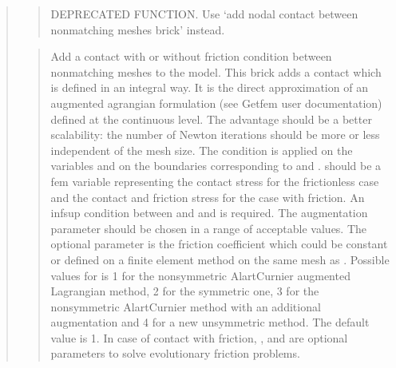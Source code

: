 \documentclass[a4paper,11pt,english]{sphinxmanual}
\begin{document}
\begin{quote}
\begin{quote}

DEPRECATED FUNCTION. Use ‘add nodal contact between nonmatching meshes brick’ instead.
\end{quote}

\begin{quote}

Add a contact with or without friction condition between nonmatching
meshes to the model. This brick adds a contact which is defined
in an integral way. It is the direct approximation of an augmented
agrangian formulation (see Getfem user documentation) defined at the
continuous level. The advantage should be a better scalability:
the number of Newton iterations should be more or less independent
of the mesh size.
The condition is applied on the variables  and 
on the boundaries corresponding to  and .
 should be a fem variable representing the contact stress
for the frictionless case and the contact and friction stress for the
case with friction. An inf\sphinxhyphen{}sup condition between  and
 and  is required.
The augmentation parameter  should be chosen in a
range of acceptable values.
The optional parameter  is the friction
coefficient which could be constant or defined on a finite element
method on the same mesh as .
Possible values for  is 1 for the non\sphinxhyphen{}symmetric Alart\sphinxhyphen{}Curnier
augmented Lagrangian method, 2 for the symmetric one, 3 for the
non\sphinxhyphen{}symmetric Alart\sphinxhyphen{}Curnier method with an additional augmentation
and 4 for a new unsymmetric method. The default value is 1.
In case of contact with friction, ,  and
 are optional parameters to solve evolutionary friction
problems.
\end{quote}


\end{quote}
\end{document}
